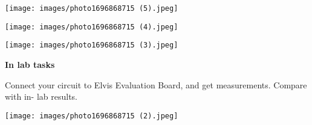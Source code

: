 \documentclass{article}
\begin{document}

\begin{flushleft}
    \centering
    \texttt{[image: images/photo1696868715 (5).jpeg]}
\end{flushleft}


\begin{flushleft}
    \centering
    \texttt{[image: images/photo1696868715 (4).jpeg]}
\end{flushleft}

\begin{flushleft}
    \centering
    \texttt{[image: images/photo1696868715 (3).jpeg]}
\end{flushleft}

\begin{flushleft}
\textbf{In lab tasks}
\end{flushleft}

Connect your circuit to Elvis Evaluation Board, and get measurements. Compare with in- lab results.

\begin{flushleft}
    \centering
    \texttt{[image: images/photo1696868715 (2).jpeg]}
\end{flushleft}






\end{document}

